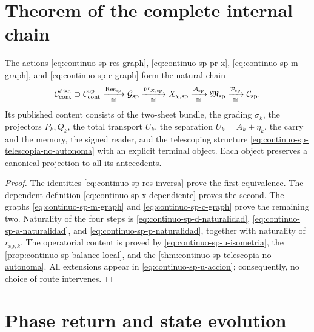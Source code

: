 \section{Theorem of the complete internal chain}

\begin{theorem}
\label{thm:continuo-sp-cadena-interna}
The actions
\eqref{eq:continuo-sp-res-graph},
\eqref{eq:continuo-sp-pr-x},
\eqref{eq:continuo-sp-m-graph}, and
\eqref{eq:continuo-sp-c-graph} form the natural chain
\begin{equation}
\label{eq:continuo-sp-cadena-interna}
 \mathcal C_{\rm cont}^{\rm disc}
 \supset\mathcal C_{\rm cont}^{\mathrm{sp}}
 \xrightarrow[\cong]{\operatorname{Res}_{\mathrm{sp}}}
 \mathcal G_{\mathrm{sp}}
 \xrightarrow[\cong]{\operatorname{pr}_{X,\mathrm{sp}}}
 X_{\chi,\mathrm{sp}}
 \xrightarrow[\cong]{\mathcal A_{\mathrm{sp}}}
 \mathfrak M_{\mathrm{sp}}
 \xrightarrow[\cong]{\mathcal P_{\mathrm{sp}}}
 \mathcal C_{\mathrm{sp}}.
\end{equation}
Its published content consists of the two-sheet bundle, the grading
\(\sigma_k\), the projectors \(P_k,Q_k\), the total transport \(U_k\),
the separation \(U_k=A_k+\eta_k\), the carry and the memory, the signed reader,
and the telescoping structure
\eqref{eq:continuo-sp-telescopia-no-autonoma} with an explicit terminal object. Each
object preserves a canonical projection to all its antecedents.
\end{theorem}

\begin{proof}
The identities
\eqref{eq:continuo-sp-res-inversa} prove the first equivalence. The
dependent definition \eqref{eq:continuo-sp-x-dependiente} proves the
second. The graphs
\eqref{eq:continuo-sp-m-graph} and
\eqref{eq:continuo-sp-c-graph} prove the remaining two. Naturality of
the four steps is
\eqref{eq:continuo-sp-d-naturalidad},
\eqref{eq:continuo-sp-a-naturalidad}, and
\eqref{eq:continuo-sp-p-naturalidad}, together with naturality of
\(r_{\mathrm{sp},k}\). The operatorial content is proved by
\eqref{eq:continuo-sp-u-isometria}, the
\cref{prop:continuo-sp-balance-local}, and the
\cref{thm:continuo-sp-telescopia-no-autonoma}. All extensions appear
in \eqref{eq:continuo-sp-u-accion}; consequently, no choice of
route intervenes.
\end{proof}

\section{Phase return and state evolution}


